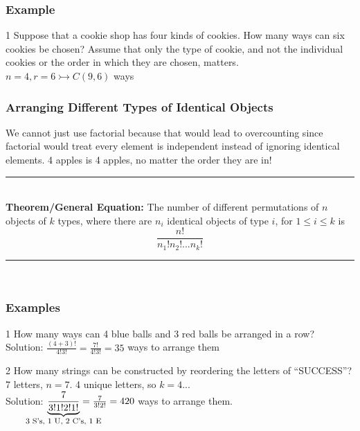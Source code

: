 \documentclass[12pt, letterpaper]{article}
\newcommand{\exheader}[1][ex]{{\tiny{#1}\normalsize}}
\newcommand{\horizline}[0]{\noindent\rule{\textwidth}{1pt}\\}
\begin{document}
\subsubsection*{Example}

\exheader[1] Suppose that a cookie shop has four kinds of cookies. How many ways can six cookies be chosen? Assume that only the type of cookie, and not the individual cookies or the order in which they are chosen, matters. \\ 
\hspace*{0.25cm} $n = 4, r=6  \rightarrowtail C(9,6)$ ways

\pagebreak

\subsubsection{Arranging Different Types of Identical Objects}
We cannot just use factorial because that would lead to overcounting since factorial would treat every element is independent instead of ignoring identical elements. 4 apples is 4 apples, no matter the order they are in!

\horizline
\textbf{Theorem/General Equation:} The number of different permutations of $n$ objects of $k$ types, where there are $n_i$ identical objects of type $i$, for $1 \le i \le k$ is \[\frac{n!}{n_1!n_2!...n_k!} \]
\vspace*{-0.5cm} \horizline \vspace*{-0.5cm}
\bigbreak

\subsubsection*{Examples} 
\bigbreak

\exheader[1] How many ways can 4 blue balls and 3 red balls be arranged in a row? \\
\hspace*{0.25cm} Solution: $\frac{(4+3)!}{4!3!} = \frac{7!}{4!3!} = 35$ ways to arrange them 

\bigbreak

\exheader[2] How many strings can be constructed by reordering the letters of “SUCCESS”? \\ 
\hspace*{0.25cm} 7 letters, $n=7$. 4 unique letters, so $k=4$... \\ 
\hspace*{0.25cm} Solution: $  \underbrace{\frac{7}{3!1!2!1!}}_{\makebox[0pt]{\footnotesize 3 S's, 1 U, 2 C's, 1 E}} = \frac{7}{3!2!} = 420$ ways to arrange them.
\end{document}
